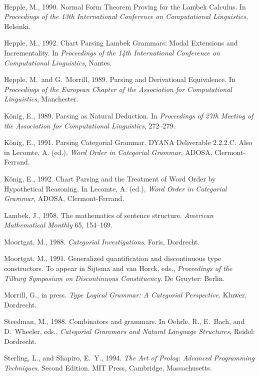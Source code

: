 \begin{list}{\ }
\item
Hepple, M., 1990.
Normal Form Theorem Proving for the Lambek Calculus.
In {\it Proceedings of the 13th International Conference on
Computational Linguistics}, Helsinki.

\item
Hepple, M., 1992.
Chart Parsing Lambek Grammars: Modal Extensions and Incrementality.
In {\it Proceedings of the 14th International Conference on
Computational Linguistics}, Nantes.

\item
Hepple, M.\ and G.~Morrill, 1989.
Parsing and Derivational Equivalence.
In {\it Proceedings of the European Chapter of the Association for
Computational Linguistics}, Manchester.

\item
K\"onig, E., 1989.
Parsing as Natural Deduction.
In {\it Proceedings of 27th Meeting of the Association for
Computational Linguistics}, 272--279.

\item
K\"onig, E., 1991.
Parsing Categorial Grammar.  DYANA Deliverable 2.2.2.C.  Also in
Lecomte, A. (ed.), {\it Word Order in Categorial
Grammar}, ADOSA, Clermont-Ferrand.

\item
K\"onig, E., 1992.
Chart Parsing and the Treatment of Word Order by Hypothetical
Reasoning.  In Lecomte, A. (ed.), {\it Word Order in Categorial
Grammar}, ADOSA, Clermont-Ferrand.


\item
Lambek, J., 1958.
 The mathematics of sentence structure.
 {\it American Mathematical Monthly} { 65}, 154--169.

\item
Moortgat, M., 1988.
{\it Categorial Investigations}.
Foris, Dordrecht.

\item
Moortgat, M., 1991.
  Generalized quantification and discontinuous type constructors.  To
appear in Sijtsma and van Horck, eds., {\it Proceedings of the Tilburg
Symposium on Discontinuous Constituency}.  De Gruyter: Berlin.


\item
Morrill, G., in press.
{\it Type Logical Grammar:  A Categorial Perspective}.
Kluwer, Dordrecht.

\item
Steedman, M., 1988.
 Combinators and grammars.
 In Oehrle, R., E.~Bach, and D.~Wheeler, eds., {\it Categorial
  Grammars and Natural Language Structures}, Reidel: Dordrecht.

\item
Sterling, L., and Shapiro, E.~Y., 1994.
 {\em The Art of Prolog: Advanced Programming Techniques}.
 Second Edition.
 MIT Press, Cambridge, Massachusetts.

\end{list}








